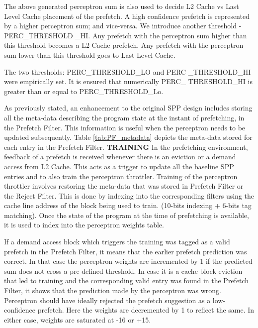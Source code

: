 \documentclass{sig-alternate}
\begin{document}
The above generated perceptron sum is also used to decide L2 Cache vs Last Level Cache placement of the prefetch. A high confidence prefetch is represented by a higher perceptron sum; and vice-versa. We introduce another threshold - PERC\_THRESHOLD \_HI. Any prefetch with the perceptron sum higher than this threshold becomes a L2 Cache prefetch. Any prefetch with the perceptron sum lower than this threshold goes to Last Level Cache.

The two thresholds: PERC\_THRESHOLD\_LO and PERC \_THRESHOLD\_HI were empirically set. It is ensured that numerically PERC\_ THRESHOLD\_HI is greater than or equal to PERC\_THRESHOLD\_Lo.

As previously stated, an enhancement to the original SPP design includes storing all the meta-data describing the program state at the instant of prefetching, in the Prefetch Filter. This information is useful when the perceptron needs to be updated subsequently. Table \ref{tab:PF_metadata} depicts the meta-data stored for each entry in the Prefetch Filter.\newline
\newline
\textbf{TRAINING}\newline
In the prefetching environment, feedback of a prefetch is received whenever there is an eviction or a demand access from L2 Cache. This acts as a trigger to update all the baseline SPP entries and to also train the perceptron throttler. Training of the perceptron throttler involves restoring the meta-data that was stored in Prefetch Filter or the Reject Filter. This is done by indexing into the corresponding filters using the cache line address of the block being used to train. (10-bits indexing + 6-bits tag matching). Once the state of the program at the time of prefetching is available, it is used to index into the perceptron weights table. 


If a demand access block which triggers the training  was tagged as a valid prefetch in the Prefetch Filter, it means that the earlier prefetch prediction was correct. In that case the perceptron weights are incremented by 1 if the predicted sum does not cross a pre-defined threshold.  In case it is a cache block eviction that led to training and the corresponding valid entry was found in the Prefetch Filter, it shows that the prediction made by the perceptron was wrong. Perceptron should have ideally rejected the prefetch suggestion as a low-confidence prefetch. Here the weights are decremented by 1 to reflect the same. In either case, weights are saturated at -16 or +15.
\end{document}
